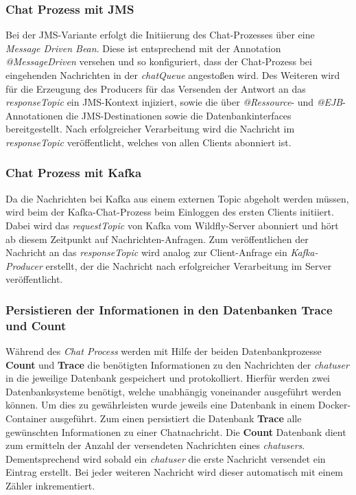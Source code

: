 \documentclass[10pt,journal,compsoc]{IEEEtran}
\begin{document}
\subsubsection{Chat Prozess mit JMS}
Bei der JMS-Variante erfolgt die Initiierung des Chat-Prozesses über eine \textit{Message Driven Bean}. Diese ist entsprechend mit der Annotation \textit{@MessageDriven} versehen und so konfiguriert, dass der Chat-Prozess bei eingehenden Nachrichten in der \textit{chatQueue} angestoßen wird. 
Des Weiteren wird für die Erzeugung des Producers für das Versenden der Antwort an das \textit{responseTopic} ein JMS-Kontext injiziert, sowie die über \textit{@Ressource}- und \textit{@EJB}-Annotationen die JMS-Destinationen sowie die Datenbankinterfaces bereitgestellt.
Nach erfolgreicher Verarbeitung wird die Nachricht im \textit{responseTopic} veröffentlicht, welches von allen Clients abonniert ist.  

\subsubsection{Chat Prozess mit Kafka}
Da die Nachrichten bei Kafka aus einem externen Topic abgeholt werden müssen, wird beim der Kafka-Chat-Prozess beim Einloggen des ersten Clients initiiert. Dabei wird das \textit{requestTopic} von Kafka vom Wildfly-Server abonniert und hört ab diesem Zeitpunkt auf Nachrichten-Anfragen.
Zum veröffentlichen der Nachricht an das \textit{responseTopic} wird analog zur Client-Anfrage ein \textit{Kafka-Producer} erstellt, der die Nachricht nach erfolgreicher Verarbeitung im Server veröffentlicht.




\subsubsection{Persistieren der Informationen in den Datenbanken Trace und Count}
\label{persistieren}
Während des \textit{Chat Process} werden mit Hilfe der beiden Datenbankprozesse \textbf{Count} und \textbf{Trace} die benötigten Informationen zu den Nachrichten der \textit{chatuser} in die jeweilige Datenbank gespeichert und protokolliert. Hierfür werden zwei Datenbanksysteme benötigt, welche unabhängig voneinander ausgeführt werden können. Um dies zu gewährleisten wurde jeweils eine Datenbank in einem Docker-Container ausgeführt. Zum einen persistiert die Datenbank \textbf{Trace} alle gewünschten Informationen zu einer Chatnachricht. Die \textbf{Count} Datenbank dient zum ermitteln der Anzahl der versendeten Nachrichten eines \textit{chatusers}. Dementsprechend wird sobald ein \textit{chatuser} die erste Nachricht versendet ein Eintrag erstellt. Bei jeder weiteren Nachricht wird dieser automatisch mit einem Zähler inkrementiert. 
\end{document}
